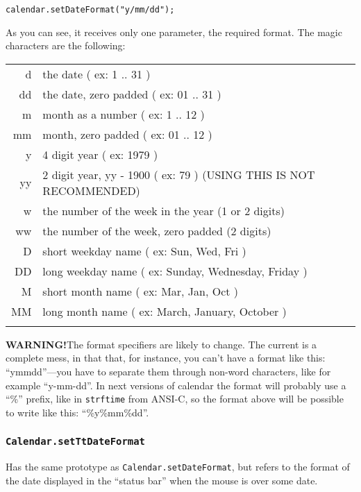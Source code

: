 \documentclass[a4paper,10pt]{article}
\begin{document}
\begin{verbatim}
calendar.setDateFormat("y/mm/dd");
\end{verbatim}

As you can see, it receives only one parameter, the required format.  The magic
characters are the following:

\begin{tabular}{ r l }
\\
d  & the date ( ex: 1 .. 31 ) \\
dd & the date, zero padded ( ex: 01 .. 31 ) \\
m  & month as a number ( ex: 1 .. 12 ) \\
mm & month, zero padded ( ex: 01 .. 12 ) \\
y  & 4 digit year ( ex: 1979 ) \\
yy & 2 digit year, yy - 1900 ( ex: 79 ) (USING THIS IS NOT RECOMMENDED) \\
w  & the number of the week in the year (1 or 2 digits) \\
ww & the number of the week, zero padded (2 digits) \\
D  & short weekday name ( ex: Sun, Wed, Fri ) \\
DD & long weekday name ( ex: Sunday, Wednesday, Friday ) \\
M  & short month name ( ex: Mar, Jan, Oct ) \\
MM & long month name ( ex: March, January, October )\\\\
\end{tabular}

{\color{red}\textbf{WARNING!}}\quad The format specifiers are likely to change.
The current is a complete mess, in that that, for instance, you can't have a
format like this: ``ymmdd''---you have to separate them through non-word
characters, like for example ``y-mm-dd''.  In next versions of calendar the
format will probably use a ``\%'' prefix, like in \texttt{strftime} from
ANSI-C, so the format above will be possible to write like this:
``\%y\%mm\%dd''.

\subsubsection{\texttt{Calendar.setTtDateFormat}}\label{sec:Calendar.setTtDateFormat}

Has the same prototype as \texttt{Calendar.setDateFormat}, but refers to the
format of the date displayed in the ``status bar'' when the mouse is over some
date.
\end{document}
